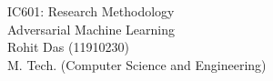 \documentclass[12pt]{article}
\begin{document}
\begin{titlepage}
\centering
\vspace*{\fill}
\huge IC601: Research Methodology\\
\LARGE Adversarial Machine Learning\\\vspace{0.8cm}
\Large Rohit Das (11910230)\\
\Large M. Tech. (Computer Science and Engineering)
\vspace*{\fill}
\end{titlepage}
\end{document}
